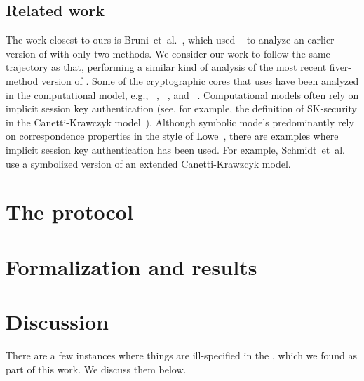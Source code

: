 \documentclass[runningheads, envcountsame, a4paper, draft, x11names]{llncs}
\newcommand{\spacehack}{\vspace{-1em}}
\newcommand{\fillhack}{\vspace{-0.5em}}
\begin{document}
\subsection{Related work}
\label{sec:relatedWork}
\fillhack
The work closest to ours is Bruni~et~al.~\cite{DBLP:conf/secsr/BruniJPS18},
which used \mProverif~\cite{DBLP:conf/csfw/Blanchet01} to analyze an earlier
version of \mEdhoc{} with only two methods.
%
We consider our work to follow the same trajectory as that, performing a
similar kind of analysis of the most recent fiver-method version of \mEdhoc{}.
%
Some of the cryptographic cores that \mEdhoc{} uses have been analyzed in the
computational model, e.g., \mSigma{}~\cite{DBLP:conf/crypto/CanettiK02},
\mOptls{}~\cite{DBLP:conf/eurosp/KrawczykW16}, and
\mNoise{}~\cite{DBLP:conf/eurosp/KobeissiNB19}.
%
Computational models often rely on implicit session key authentication
(see, for example, the definition of SK-security in the Canetti-Krawczyk
model~\cite{DBLP:conf/crypto/CanettiK02}).
%
Although symbolic models predominantly rely on correspondence properties
in the style of Lowe~\cite{DBLP:conf/csfw/Lowe97a},
there are examples where implicit session key authentication has been used.
%
For example, Schmidt~et~al.~\cite{DBLP:conf/csfw/SchmidtMCB12} use a
symbolized version of an extended Canetti-Krawzcyk model.
%

\spacehack
\section{The \mEdhoc{} protocol}
\label{sec:edhoc}


\spacehack
\section{Formalization and results}
\label{sec:formalization}


\spacehack
\section{Discussion}
\label{sec:discussion}
\fillhack
There are a few instances where things are ill-specified in the \mSpec{},
which we found as part of this work. We discuss them below.
%
\spacehack
\end{document}
